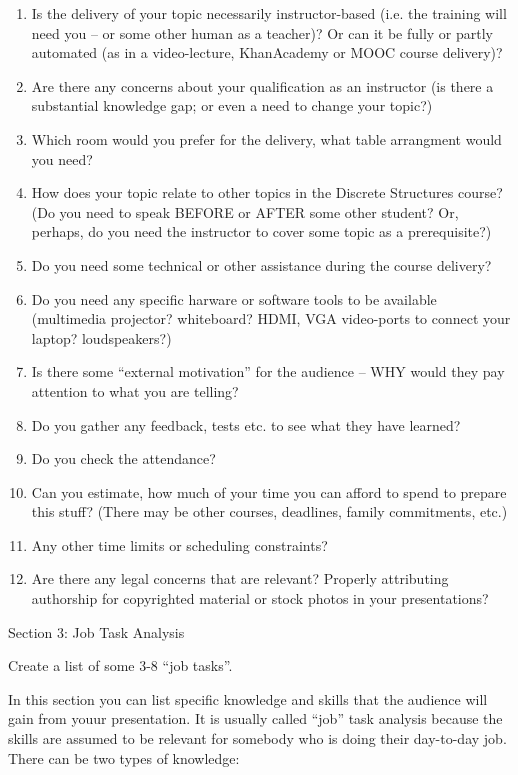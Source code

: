 \documentclass[jou]{apa6}
\begin{document}
\begin{enumerate}[(1)]
\item Is the delivery of your topic necessarily instructor-based 
(i.e. the training will need you – or some other human as a teacher)? 
Or can it be fully or partly automated (as in a video-lecture, 
KhanAcademy or MOOC course delivery)?
\item Are there any concerns about your qualification as an instructor 
(is there a substantial knowledge gap; or even a need to change your topic?)
\item Which room would you prefer for the delivery, what table arrangment would you need? 
\item How does your topic relate to other topics in the Discrete Structures course? 
(Do you need to speak BEFORE or AFTER some other student? Or, perhaps, 
do you need the instructor to cover some topic as a prerequisite?)
\item Do you need some technical or other assistance during the course delivery?
\item Do you need any specific harware or software tools to be available 
(multimedia projector? whiteboard? HDMI, VGA video-ports to connect your laptop? loudspeakers?)
\item Is there some “external motivation” for the audience – WHY would they pay attention to what you are telling?
\item Do you gather any feedback, tests etc. to see what they have learned?
\item Do you check the attendance? 
\item Can you estimate, how much of your time you can afford to spend to prepare this stuff? 
(There may be other courses, deadlines, family commitments, etc.)
\item Any other time limits or scheduling constraints?
\item Are there any legal concerns that are relevant? Properly attributing authorship 
for copyrighted material or stock photos in your presentations?  
\end{enumerate}



\vspace{20pt}
{\large Section 3: Job Task Analysis}

{\footnotesize Create a list of some 3-8 ``job tasks''.}

In this section you can list specific knowledge and skills that the audience 
will gain from youur presentation. It is usually called “job” task analysis \textendash{} 
because the skills are assumed to be relevant for somebody who is doing their day-to-day job. 
There can be two types of knowledge:
\end{document}
